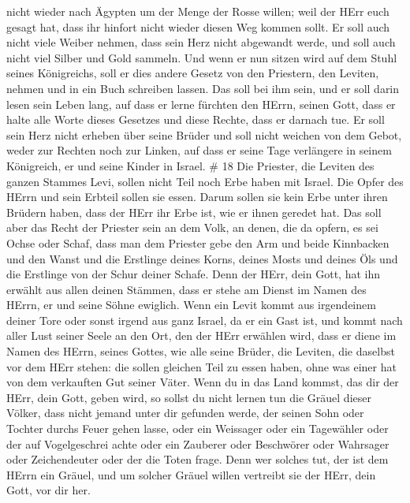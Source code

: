 nicht wieder nach Ägypten um der Menge der Rosse willen; weil der HErr
euch gesagt hat, dass ihr hinfort nicht wieder diesen Weg kommen sollt.
 Er soll auch nicht viele Weiber nehmen, dass sein Herz
nicht abgewandt werde, und soll auch nicht viel Silber und Gold sammeln.
 Und wenn er nun sitzen wird auf dem Stuhl seines
Königreichs, soll er dies andere Gesetz von den Priestern, den Leviten,
nehmen und in ein Buch schreiben lassen.  Das soll bei ihm
sein, und er soll darin lesen sein Leben lang, auf dass er lerne
fürchten den HErrn, seinen Gott, dass er halte alle Worte dieses
Gesetzes und diese Rechte, dass er darnach tue.  Er soll
sein Herz nicht erheben über seine Brüder und soll nicht weichen von dem
Gebot, weder zur Rechten noch zur Linken, auf dass er seine Tage
verlängere in seinem Königreich, er und seine Kinder in Israel. \# 18
 Die Priester, die Leviten des ganzen Stammes Levi, sollen
nicht Teil noch Erbe haben mit Israel. Die Opfer des HErrn und sein
Erbteil sollen sie essen.  Darum sollen sie kein Erbe unter
ihren Brüdern haben, dass der HErr ihr Erbe ist, wie er ihnen geredet
hat.  Das soll aber das Recht der Priester sein an dem Volk,
an denen, die da opfern, es sei Ochse oder Schaf, dass man dem Priester
gebe den Arm und beide Kinnbacken und den Wanst  und die
Erstlinge deines Korns, deines Mosts und deines Öls und die Erstlinge
von der Schur deiner Schafe.  Denn der HErr, dein Gott, hat
ihn erwählt aus allen deinen Stämmen, dass er stehe am Dienst im Namen
des HErrn, er und seine Söhne ewiglich.  Wenn ein Levit
kommt aus irgendeinem deiner Tore oder sonst irgend aus ganz Israel, da
er ein Gast ist, und kommt nach aller Lust seiner Seele an den Ort, den
der HErr erwählen wird,  dass er diene im Namen des HErrn,
seines Gottes, wie alle seine Brüder, die Leviten, die daselbst vor dem
HErr stehen:  die sollen gleichen Teil zu essen haben, ohne
was einer hat von dem verkauften Gut seiner Väter.  Wenn du
in das Land kommst, das dir der HErr, dein Gott, geben wird, so sollst
du nicht lernen tun die Gräuel dieser Völker,  dass nicht
jemand unter dir gefunden werde, der seinen Sohn oder Tochter durchs
Feuer gehen lasse, oder ein Weissager oder ein Tagewähler oder der auf
Vogelgeschrei achte oder ein Zauberer  oder Beschwörer oder
Wahrsager oder Zeichendeuter oder der die Toten frage. 
Denn wer solches tut, der ist dem HErrn ein Gräuel, und um solcher
Gräuel willen vertreibt sie der HErr, dein Gott, vor dir her.
